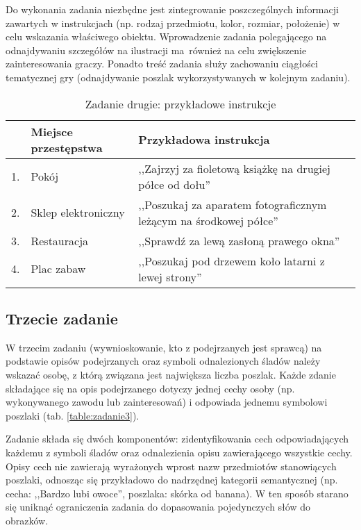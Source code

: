     Do wykonania zadania niezbędne jest zintegrowanie poszczególnych informacji zawartych w instrukcjach (np. rodzaj przedmiotu, kolor, rozmiar, położenie) w celu wskazania właściwego obiektu.
    Wprowadzenie zadania polegającego na odnajdywaniu szczegółów na ilustracji ma~również na celu zwiększenie zainteresowania graczy.
    Ponadto treść zadania służy zachowaniu ciągłości tematycznej gry (odnajdywanie poszlak wykorzystywanych w kolejnym zadaniu).
    
    \begin{table}
        \begin{tabularx}{\textwidth}{ l l X }
         \hline
        
         \hline
          & \textbf{Miejsce przestępstwa} & \textbf{Przykładowa instrukcja} \\
          \hline
         1. & Pokój & ,,Zajrzyj za fioletową książkę na drugiej półce od dołu'' \\
         2. & Sklep elektroniczny & ,,Poszukaj za aparatem fotograficznym leżącym na środkowej półce'' \\
         3. & Restauracja & ,,Sprawdź za lewą zasłoną prawego okna'' \\
         4. & Plac zabaw & ,,Poszukaj pod drzewem koło latarni z lewej strony'' \\
         \hline
         
         \hline
        \end{tabularx}
        \caption{Zadanie drugie: przykładowe instrukcje}
        \label{table:zadanie2}
    \end{table}
    
    \subsection{Trzecie zadanie}
    W trzecim zadaniu (wywnioskowanie, kto z podejrzanych jest sprawcą) na podstawie opisów podejrzanych oraz symboli odnalezionych śladów należy wskazać osobę, z którą związana jest największa liczba poszlak.
    Każde zdanie składające się na opis podejrzanego dotyczy jednej cechy osoby (np. wykonywanego zawodu lub zainteresowań) i odpowiada jednemu symbolowi poszlaki (tab. \ref{table:zadanie3}).
    
    Zadanie składa się dwóch komponentów: zidentyfikowania cech odpowiadających każdemu z symboli śladów oraz odnalezienia opisu zawierającego wszystkie cechy.
    Opisy cech nie zawierają wyrażonych wprost nazw przedmiotów stanowiących poszlaki, odnosząc się przykładowo do nadrzędnej kategorii semantycznej (np. cecha: ,,Bardzo lubi owoce'', poszlaka: skórka od banana).
    W ten sposób starano się uniknąć ograniczenia zadania do dopasowania pojedynczych słów do obrazków.
    
